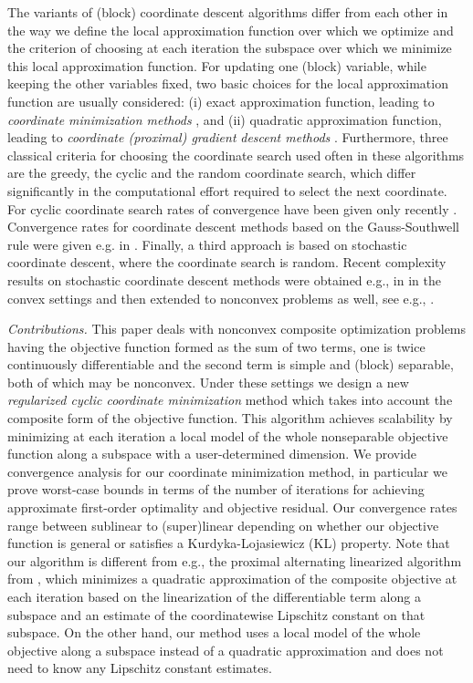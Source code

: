 \documentclass[lettersize,journal]{IEEEtran}
\begin{document}
\medskip 

\noindent The variants of  (block) coordinate descent algorithms differ from each other in the way  we define the local approximation function over which we optimize  and the criterion of choosing at each iteration the subspace over which we minimize this local approximation function.  For updating one (block) variable, while keeping the other variables fixed,  two basic choices for the local approximation function  are usually considered: (i) exact approximation function, leading to \textit{coordinate minimization methods} \cite{Ber:99, NecCho:24},  and (ii)  quadratic approximation function, leading to \textit{coordinate (proximal) gradient}  \textit{descent   methods} \cite{BecTet:13,NecCli:16,NecCho:24,TseYun:09}.  Furthermore, three classical criteria for choosing the coordinate search  used often in these algorithms are the greedy, the cyclic and the random coordinate search, which differ significantly in the computational effort required to select the next coordinate. For cyclic coordinate search rates of convergence have been given only recently \cite{BecTet:13,Teb:14}. Convergence rates for coordinate descent methods based on the Gauss-Southwell rule  were given e.g.  in \cite{TseYun:09}. Finally, a third  approach is based on stochastic coordinate descent, where the coordinate search is random. Recent complexity results on stochastic coordinate descent methods were obtained  e.g., in \cite{FerRic:15,NecCli:16} in the convex settings and then extended to nonconvex problems as well, see e.g.,  \cite{NecCho:24}. 

\medskip 

\noindent \textit{Contributions.} This paper deals with nonconvex composite  optimization problems having  the  objective function formed as the sum of two  terms, one is twice continuously differentiable  and the second  term is simple and (block) separable, both of which may be nonconvex.  Under these settings we design a new  \textit{regularized cyclic  coordinate minimization} method which takes into account the composite form of the objective function. This algorithm achieves scalability by minimizing at each iteration a local model of the whole nonseparable  objective function along  a  subspace with a user-determined dimension.   We provide convergence  analysis for our  coordinate minimization  method, in particular we prove worst-case bounds in terms of the number of iterations for achieving approximate first-order optimality and objective residual. Our convergence rates range between sublinear to (super)linear depending on whether our objective function is general or satisfies  a  Kurdyka-Lojasiewicz (KL) property.  Note that our algorithm is different from e.g., the proximal alternating  linearized  algorithm  from \cite{Teb:14}, which minimizes a quadratic approximation of the composite objective at each iteration based on the linearization of  the differentiable term along a subspace and an estimate of the coordinatewise Lipschitz constant on that subspace.  On the other hand, our method uses a local model of the whole objective along a subspace instead of a quadratic approximation and does not need to know any Lipschitz constant estimates. 
\end{document}
